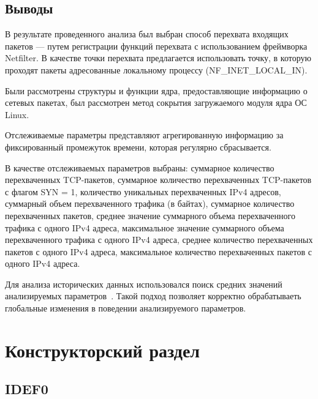 \documentclass{bmstu}
\begin{document}

\section{Выводы}

В результате проведенного анализа был выбран способ перехвата входящих пакетов --- путем регистрации функций перехвата с использованием фреймворка Netfilter. В качестве точки перехвата предлагается использовать точку, в которую проходят пакеты адресованные локальному процессу (NF\_INET\_LOCAL\_IN).

Были рассмотрены структуры и функции ядра, предоставляющие  информацию о сетевых пакетах, был рассмотрен метод сокрытия загружаемого модуля ядра ОС Linux.

Отслеживаемые параметры представляют агрегированную информацию за фиксированный промежуток времени, которая регулярно сбрасывается.

В качестве отслеживаемых параметров выбраны: суммарное количество перехваченных TCP-пакетов, суммарное количество перехваченных TCP-пакетов с флагом SYN = 1, количество уникальных перехваченных IPv4 адресов, суммарный объем перехваченного трафика (в байтах), суммарное количество перехваченных пакетов, среднее значение суммарного объема перехваченного трафика с одного IPv4 адреса, максимальное значение суммарного объема перехваченного трафика с одного IPv4 адреса, среднее количество перехваченных пакетов с одного IPv4 адреса, максимальное количество перехваченных пакетов с одного IPv4 адреса.

Для анализа исторических данных использовался поиск средних значений анализируемых параметров~\cite{карачанская2019метод}. Такой подход позволяет корректно обрабатываеть глобальные изменения в поведении анализируемого параметров.


\chapter{Конструкторский раздел}

\section{IDEF0}
\end{document}
